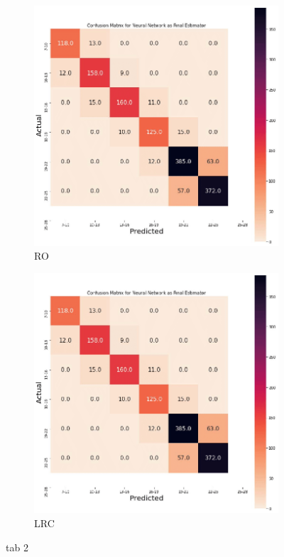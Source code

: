 \begin{figure}[hbt!]
\medskip %
\begin{subfigure}{.475\linewidth}
  \includegraphics[trim={0 0 0 0.72cm},clip,width=\linewidth]{gorseller/Confusion-Matrix.png}
  \caption{RO}
  \label{velcomp0}
\end{subfigure}\hfill %
\begin{subfigure}{.475\linewidth}
  \includegraphics[trim={0 0 0 0.72cm},clip,width=\linewidth]{gorseller/Confusion-Matrix.png}
  \caption{LRC}
  \label{estcomp0}
\end{subfigure}

\caption{tab 2}
\label{fig:ckrawgeoall}
\end{figure}


